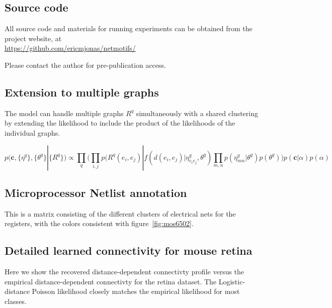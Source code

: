 \documentclass{nature}
\renewcommand{\vec}[1]{\mathbf{#1}}
\begin{document}
\subsection{Source code}

All source code and materials for running experiments can be
obtained from the project website, at \\

\href{http://https://github.com/ericmjonas/netmotifs}{https://github.com/ericmjonas/netmotifs/}

Please contact the author for pre-publication access. 


\subsection{Extension to multiple graphs}
\label{supp:multigraph}
The model can handle multiple graphs $R^q$ simultaneously with a shared clustering by extending the likelihood to include the product of the likelihoods of the individual graphs. 

\begin{equation}
  p(\vec{c}, \{\eta^q\}, \{\theta^q\} | \{R^q\} ) \propto \prod_q \Bigg(\prod_{i, j} p(R^q(e_i, e_j) | f(d(e_i, e_j) | \eta^q_{c_ic_j}, \theta^q) \prod_{m, n} p(\eta^q_{mn} | \theta^q)  p(\theta^q) \Bigg) p(\vec{c} | \alpha) p(\alpha) 
\end{equation}

\FloatBarrier

\subsection{Microprocessor Netlist annotation}
\label{supp:mos6502netlist}
This is a matrix consisting of the different clusters of electrical nets for 
the registers, with the colors consistent with figure~\ref{fig:mos6502}. 





\newpage

\FloatBarrier
\subsection{Detailed learned connectivity for mouse retina}

Here we show the recovered distance-dependent connectivty profile
versus the empirical distance-dependent connectivty for the
retina dataset. The Logistic-distance Poisson likelihood closely
matches the empirical likelihood for most classes.
\end{document}
